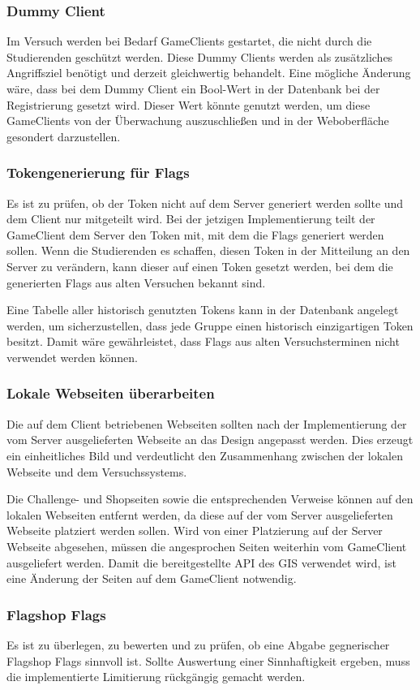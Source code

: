 \subsubsection{Dummy Client}
Im Versuch werden bei Bedarf GameClients gestartet, die nicht durch die Studierenden geschützt werden. Diese Dummy Clients werden als zusätzliches Angriffsziel benötigt und derzeit gleichwertig behandelt. Eine mögliche Änderung wäre, dass bei dem Dummy Client ein Bool-Wert in der Datenbank bei der Registrierung gesetzt wird. Dieser Wert könnte genutzt werden, um diese GameClients von der Überwachung auszuschließen und in der \linebreak Weboberfläche gesondert darzustellen.

\subsubsection{Tokengenerierung für Flags}
Es ist zu prüfen, ob der Token nicht auf dem Server generiert werden sollte und dem Client nur mitgeteilt wird. Bei der jetzigen Implementierung teilt der GameClient dem Server den Token mit, mit dem die Flags generiert werden sollen. Wenn die Studierenden es schaffen, diesen Token in der Mitteilung an den Server zu verändern, kann dieser auf einen Token gesetzt werden, bei dem die generierten Flags aus alten Versuchen bekannt sind.

Eine Tabelle aller historisch genutzten Tokens kann in der Datenbank angelegt werden, um sicherzustellen, dass jede Gruppe einen historisch einzigartigen Token besitzt. Damit wäre gewährleistet, dass Flags aus alten Versuchsterminen nicht verwendet werden können.

\subsubsection{Lokale Webseiten überarbeiten}
Die auf dem Client betriebenen Webseiten sollten nach der Implementierung der vom Server ausgelieferten Webseite an das Design angepasst werden. Dies erzeugt ein einheitliches Bild und verdeutlicht den Zusammenhang zwischen der lokalen Webseite und dem \linebreak Versuchssystems.

Die Challenge- und Shopseiten sowie die entsprechenden Verweise können auf den lokalen Webseiten entfernt werden, da diese auf der vom Server ausgelieferten Webseite platziert \linebreak werden sollen. Wird von einer Platzierung auf der Server Webseite abgesehen, müssen die \linebreak angesprochen Seiten weiterhin vom GameClient ausgeliefert werden. Damit die bereitgestellte API des GIS verwendet wird, ist eine Änderung der Seiten auf dem GameClient notwendig.

\subsubsection{Flagshop Flags}
Es ist zu überlegen, zu bewerten und zu prüfen, ob eine Abgabe gegnerischer Flagshop Flags sinnvoll ist. Sollte Auswertung einer Sinnhaftigkeit ergeben, muss die implementierte \linebreak Limitierung rückgängig gemacht werden.